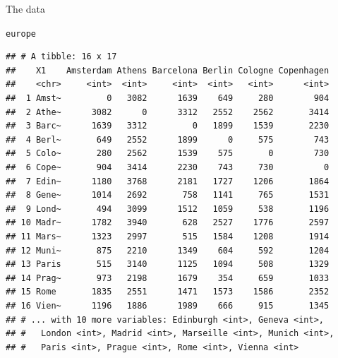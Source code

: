 \documentclass[unknownkeysallowed]{beamer}\usepackage[]{graphicx}\usepackage[]{color}
\makeatletter
\newcommand{\hlstd}[1]{\textcolor[rgb]{0.345,0.345,0.345}{#1}}%
\newenvironment{kframe}{%
 \def\at@end@of@kframe{}%
 \ifinner\ifhmode%
  \def\at@end@of@kframe{\end{minipage}}%
  \begin{minipage}{\columnwidth}%
 \fi\fi%
 \def\FrameCommand##1{\hskip\@totalleftmargin \hskip-\fboxsep
 \colorbox{shadecolor}{##1}\hskip-\fboxsep
     \hskip-\linewidth \hskip-\@totalleftmargin \hskip\columnwidth}%
 \MakeFramed {\advance\hsize-\width
   \@totalleftmargin\z@ \linewidth\hsize
   \@setminipage}}%
 {\par\unskip\endMakeFramed%
 \at@end@of@kframe}
\newenvironment{knitrout}{}{} %
\makeatother
\begin{document}
\begin{frame}[fragile]{The data}
  
\begin{knitrout}\scriptsize
{}\color{fgcolor}\begin{kframe}
\begin{alltt}
\hlstd{europe}
\end{alltt}
\begin{verbatim}
## # A tibble: 16 x 17
##    X1    Amsterdam Athens Barcelona Berlin Cologne Copenhagen
##    <chr>     <int>  <int>     <int>  <int>   <int>      <int>
##  1 Amst~         0   3082      1639    649     280        904
##  2 Athe~      3082      0      3312   2552    2562       3414
##  3 Barc~      1639   3312         0   1899    1539       2230
##  4 Berl~       649   2552      1899      0     575        743
##  5 Colo~       280   2562      1539    575       0        730
##  6 Cope~       904   3414      2230    743     730          0
##  7 Edin~      1180   3768      2181   1727    1206       1864
##  8 Gene~      1014   2692       758   1141     765       1531
##  9 Lond~       494   3099      1512   1059     538       1196
## 10 Madr~      1782   3940       628   2527    1776       2597
## 11 Mars~      1323   2997       515   1584    1208       1914
## 12 Muni~       875   2210      1349    604     592       1204
## 13 Paris       515   3140      1125   1094     508       1329
## 14 Prag~       973   2198      1679    354     659       1033
## 15 Rome       1835   2551      1471   1573    1586       2352
## 16 Vien~      1196   1886      1989    666     915       1345
## # ... with 10 more variables: Edinburgh <int>, Geneva <int>,
## #   London <int>, Madrid <int>, Marseille <int>, Munich <int>,
## #   Paris <int>, Prague <int>, Rome <int>, Vienna <int>
\end{verbatim}
\end{kframe}
\end{knitrout}
\end{frame}
\end{document}
